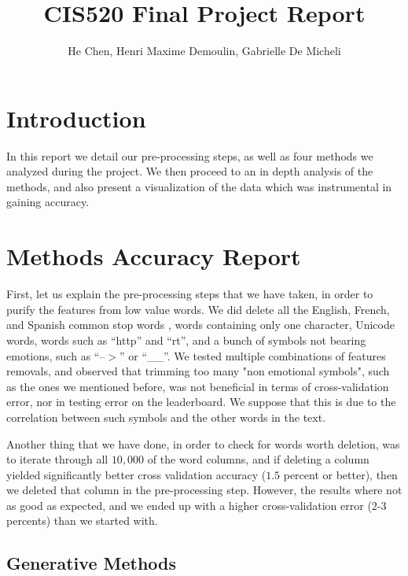\documentclass[11pt,twocolumn]{report}
\author{He Chen, Henri Maxime Demoulin, Gabrielle De Micheli}
\title{CIS520 Final Project Report}
\begin{document}
\maketitle
\section*{Introduction}
    In this report we detail our pre-processing steps, as well as four methods we analyzed during the project. We then proceed to an in depth analysis of the methods, and also present a visualization of the data which was instrumental in gaining accuracy.

\section*{Methods Accuracy Report}
    First, let us explain the pre-processing steps that we have taken, in order to purify the features from low value words. We did delete all the English, French, and Spanish common stop words \cite{stopwords}, words containing only one character, Unicode words, words such as ``http'' and ``rt'', and a bunch of symbols not bearing emotions, such as ``--$>$'' or ``\_\_''. We tested multiple combinations of features removals, and observed that trimming too many "non emotional symbols", such as the ones we mentioned before, was not beneficial in terms of cross-validation error, nor in testing error on the leaderboard. We suppose that this is due to the correlation between such symbols and the other words in the text.
    \par
	Another thing that we have done, in order to check for words worth deletion, was to iterate through all $10,000$ of the word columns, and if deleting a column yielded significantly better cross validation accuracy ($1.5$ percent or better), then we deleted that column in the pre-processing step. However, the results where not as good as expected, and we ended up with a higher cross-validation error ($2$-$3$ percents) than we started with.
    
    \subsection*{Generative Methods}
\end{document}
